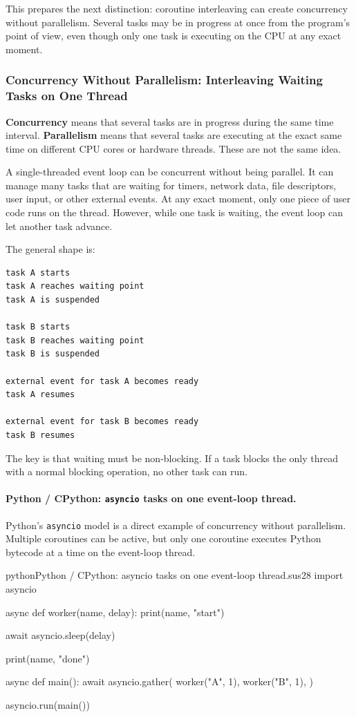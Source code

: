 This prepares the next distinction: coroutine interleaving can create concurrency without parallelism. Several tasks may be in progress at once from the program's point of view, even though only one task is executing on the CPU at any exact moment.



\subsubsection{Concurrency Without Parallelism: Interleaving Waiting Tasks on One Thread}

\textbf{Concurrency} means that several tasks are in progress during the same time interval. \textbf{Parallelism} means that several tasks are executing at the exact same time on different CPU cores or hardware threads. These are not the same idea.

A single-threaded event loop can be concurrent without being parallel. It can manage many tasks that are waiting for timers, network data, file descriptors, user input, or other external events. At any exact moment, only one piece of user code runs on the thread. However, while one task is waiting, the event loop can let another task advance.

The general shape is:

\begin{verbatim}
task A starts
task A reaches waiting point
task A is suspended

task B starts
task B reaches waiting point
task B is suspended

external event for task A becomes ready
task A resumes

external event for task B becomes ready
task B resumes
\end{verbatim}

The key is that waiting must be non-blocking. If a task blocks the only thread with a normal blocking operation, no other task can run.

\paragraph{Python / CPython: \texttt{asyncio} tasks on one event-loop thread.}

Python's \texttt{asyncio} model is a direct example of concurrency without parallelism. Multiple coroutines can be active, but only one coroutine executes Python bytecode at a time on the event-loop thread.

\begin{codebox}[]{python}{Python / CPython: asyncio tasks on one event-loop thread.}{sus28}
import asyncio


async def worker(name, delay):
    print(name, "start")

    await asyncio.sleep(delay)

    print(name, "done")


async def main():
    await asyncio.gather(
        worker("A", 1),
        worker("B", 1),
    )


asyncio.run(main())
\end{codebox}


